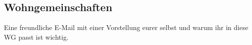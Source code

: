 \newpage
\raggedcolumns
\begin{multicols}{2}
\subsection*{Wohngemeinschaften}
Eine freundliche E-Mail mit einer Vorstellung eurer selbst und warum ihr
in diese WG passt ist wichtig.

\begin{urlList}
\end{urlList}







\end{multicols}
